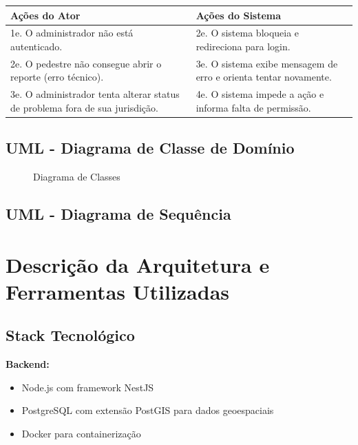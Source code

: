 \documentclass[12pt,a4paper]{article}
\begin{document}
\begin{longtable}{|>{\raggedright\arraybackslash}p{7cm}|>{\raggedright\arraybackslash}p{7cm}|}
\hline
\textbf{Ações do Ator} & \textbf{Ações do Sistema} \\
\hline
1e. O administrador não está autenticado. & 2e. O sistema bloqueia e redireciona para login. \\
\hline
2e. O pedestre não consegue abrir o reporte (erro técnico). & 3e. O sistema exibe mensagem de erro e orienta tentar novamente. \\
\hline
3e. O administrador tenta alterar status de problema fora de sua jurisdição. & 4e. O sistema impede a ação e informa falta de permissão. \\
\hline
\end{longtable}

\subsection{UML - Diagrama de Classe de Domínio}

\begin{figure}[H]
\centering
\resizebox{0.95\textwidth}{!}{%
    
}
\caption{Diagrama de Classes}
\end{figure}

\subsection{UML - Diagrama de Sequência}

\section{Descrição da Arquitetura e Ferramentas Utilizadas}
\label{sec:arquitetura}

\subsection{Stack Tecnológico}

\textbf{Backend:}
\begin{itemize}
    \item Node.js com framework NestJS
    \item PostgreSQL com extensão PostGIS para dados geoespaciais
    \item Docker para containerização
\end{itemize}
\end{document}
